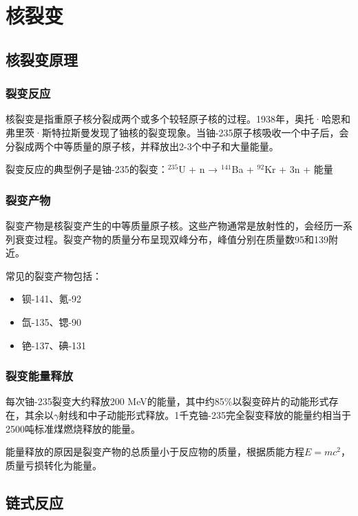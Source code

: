 \documentclass[12pt,UTF8]{ctexbook}
\begin{document}
\part{核裂变}

\chapter{核裂变原理}

\section{裂变反应}

核裂变是指重原子核分裂成两个或多个较轻原子核的过程。1938年，奥托·哈恩和弗里茨·斯特拉斯曼发现了铀核的裂变现象。当铀-235原子核吸收一个中子后，会分裂成两个中等质量的原子核，并释放出2-3个中子和大量能量。

裂变反应的典型例子是铀-235的裂变：$^{235}$U + n → $^{141}$Ba + $^{92}$Kr + 3n + 能量

\section{裂变产物}

裂变产物是核裂变产生的中等质量原子核。这些产物通常是放射性的，会经历一系列衰变过程。裂变产物的质量分布呈现双峰分布，峰值分别在质量数95和139附近。

常见的裂变产物包括：
\begin{itemize}[leftmargin=2cm]
    \item 钡-141、氪-92
    \item 氙-135、锶-90
    \item 铯-137、碘-131
\end{itemize}

\section{裂变能量释放}

每次铀-235裂变大约释放200 MeV的能量，其中约85\%以裂变碎片的动能形式存在，其余以$\gamma$射线和中子动能形式释放。1千克铀-235完全裂变释放的能量约相当于2500吨标准煤燃烧释放的能量。

能量释放的原因是裂变产物的总质量小于反应物的质量，根据质能方程$E=mc^2$，质量亏损转化为能量。

\chapter{链式反应}
\end{document}
